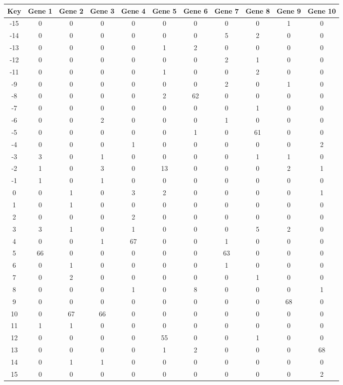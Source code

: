 \begin{tabular}{|c|c|c|c|c|c|c|c|c|c|c|}
\hline
Key & Gene 1 & Gene 2 & Gene 3 & Gene 4 & Gene 5 & Gene 6 & Gene 7 & Gene 8 & Gene 9 & Gene 10 \\
\hline
-15 & 0 & 0 & 0 & 0 & 0 & 0 & 0 & 0 & 1 & 0 \\
-14 & 0 & 0 & 0 & 0 & 0 & 0 & 5 & 2 & 0 & 0 \\
-13 & 0 & 0 & 0 & 0 & 1 & 2 & 0 & 0 & 0 & 0 \\
-12 & 0 & 0 & 0 & 0 & 0 & 0 & 2 & 1 & 0 & 0 \\
-11 & 0 & 0 & 0 & 0 & 1 & 0 & 0 & 2 & 0 & 0 \\
-9 & 0 & 0 & 0 & 0 & 0 & 0 & 2 & 0 & 1 & 0 \\
-8 & 0 & 0 & 0 & 0 & 2 & 62 & 0 & 0 & 0 & 0 \\
-7 & 0 & 0 & 0 & 0 & 0 & 0 & 0 & 1 & 0 & 0 \\
-6 & 0 & 0 & 2 & 0 & 0 & 0 & 1 & 0 & 0 & 0 \\
-5 & 0 & 0 & 0 & 0 & 0 & 1 & 0 & 61 & 0 & 0 \\
-4 & 0 & 0 & 0 & 1 & 0 & 0 & 0 & 0 & 0 & 2 \\
-3 & 3 & 0 & 1 & 0 & 0 & 0 & 0 & 1 & 1 & 0 \\
-2 & 1 & 0 & 3 & 0 & 13 & 0 & 0 & 0 & 2 & 1 \\
-1 & 1 & 0 & 1 & 0 & 0 & 0 & 0 & 0 & 0 & 0 \\
0 & 0 & 1 & 0 & 3 & 2 & 0 & 0 & 0 & 0 & 1 \\
1 & 0 & 1 & 0 & 0 & 0 & 0 & 0 & 0 & 0 & 0 \\
2 & 0 & 0 & 0 & 2 & 0 & 0 & 0 & 0 & 0 & 0 \\
3 & 3 & 1 & 0 & 1 & 0 & 0 & 0 & 5 & 2 & 0 \\
4 & 0 & 0 & 1 & 67 & 0 & 0 & 1 & 0 & 0 & 0 \\
5 & 66 & 0 & 0 & 0 & 0 & 0 & 63 & 0 & 0 & 0 \\
6 & 0 & 1 & 0 & 0 & 0 & 0 & 1 & 0 & 0 & 0 \\
7 & 0 & 2 & 0 & 0 & 0 & 0 & 0 & 1 & 0 & 0 \\
8 & 0 & 0 & 0 & 1 & 0 & 8 & 0 & 0 & 0 & 1 \\
9 & 0 & 0 & 0 & 0 & 0 & 0 & 0 & 0 & 68 & 0 \\
10 & 0 & 67 & 66 & 0 & 0 & 0 & 0 & 0 & 0 & 0 \\
11 & 1 & 1 & 0 & 0 & 0 & 0 & 0 & 0 & 0 & 0 \\
12 & 0 & 0 & 0 & 0 & 55 & 0 & 0 & 1 & 0 & 0 \\
13 & 0 & 0 & 0 & 0 & 1 & 2 & 0 & 0 & 0 & 68 \\
14 & 0 & 1 & 1 & 0 & 0 & 0 & 0 & 0 & 0 & 0 \\
15 & 0 & 0 & 0 & 0 & 0 & 0 & 0 & 0 & 0 & 2 \\
\hline
\end{tabular}